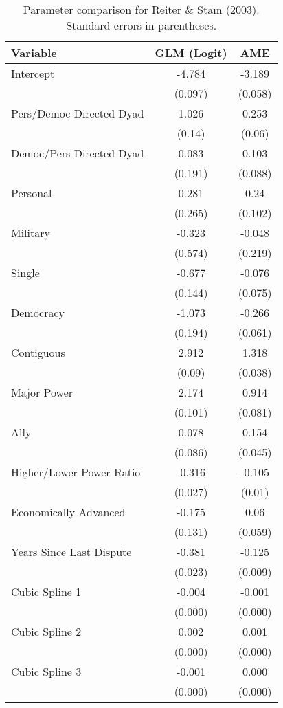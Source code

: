 \begin{table}[ht]
\centering
\begingroup\normalsize
\begin{tabular}{lcc}
 Variable & GLM (Logit) & AME \\ 
  \hline
\hline
Intercept & -4.784 & -3.189 \\ 
   & (0.097) & (0.058) \\ 
  Pers/Democ Directed Dyad & 1.026 & 0.253 \\ 
   & (0.14) & (0.06) \\ 
  Democ/Pers Directed Dyad & 0.083 & 0.103 \\ 
   & (0.191) & (0.088) \\ 
  Personal & 0.281 & 0.24 \\ 
   & (0.265) & (0.102) \\ 
  Military & -0.323 & -0.048 \\ 
   & (0.574) & (0.219) \\ 
  Single & -0.677 & -0.076 \\ 
   & (0.144) & (0.075) \\ 
  Democracy & -1.073 & -0.266 \\ 
   & (0.194) & (0.061) \\ 
  Contiguous & 2.912 & 1.318 \\ 
   & (0.09) & (0.038) \\ 
  Major Power & 2.174 & 0.914 \\ 
   & (0.101) & (0.081) \\ 
  Ally & 0.078 & 0.154 \\ 
   & (0.086) & (0.045) \\ 
  Higher/Lower Power Ratio & -0.316 & -0.105 \\ 
   & (0.027) & (0.01) \\ 
  Economically Advanced & -0.175 & 0.06 \\ 
   & (0.131) & (0.059) \\ 
  Years Since Last Dispute & -0.381 & -0.125 \\ 
   & (0.023) & (0.009) \\ 
  Cubic Spline 1 & -0.004 & -0.001 \\ 
   & (0.000) & (0.000) \\ 
  Cubic Spline 2 & 0.002 & 0.001 \\ 
   & (0.000) & (0.000) \\ 
  Cubic Spline 3 & -0.001 & 0.000 \\ 
   & (0.000) & (0.000) \\ 
   \hline
\hline
\end{tabular}
\endgroup
\caption{Parameter comparison for Reiter \& Stam (2003). Standard errors in parentheses.} 
\label{tab:appendix_tableB1_coef}
\end{table}
